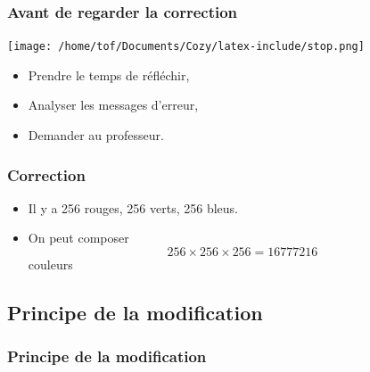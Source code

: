 \documentclass[svgnames,11pt]{beamer}
\begin{document}
\begin{frame}
    \frametitle{Avant de regarder la correction}
\begin{center}
    \centering
    \texttt{[image: /home/tof/Documents/Cozy/latex-include/stop.png]}
    \end{center}
{\Large
    \begin{itemize}
        \item Prendre le temps de réfléchir,
        \item Analyser les messages d'erreur,
        \item Demander au professeur.
    \end{itemize}
}
\end{frame}
\begin{frame}
    \frametitle{Correction}

    \begin{itemize}
        \item Il y a 256 rouges, 256 verts, 256 bleus.
        \item On peut composer
        $$256×256×256=16777216$$ couleurs
    \end{itemize}

\end{frame}
\subsection{Principe de la modification}
\begin{frame}
    \frametitle{Principe de la modification}

    

\end{frame}
\end{document}
